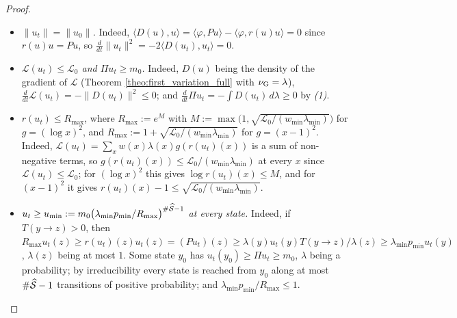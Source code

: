 \begin{proof}
\begin{itemize}
    \item \emph{$\|u_t\|=\|u_0\|$.} Indeed, $\langle D(u),u\rangle=\langle\varphi,Pu\rangle-\langle\varphi,r(u)u\rangle=0$ since $r(u)u=Pu$, so $\frac d{dt}\|u_t\|^2=-2\langle D(u_t),u_t\rangle=0$.
    \item \emph{$\mathcal L(u_t)\leq\mathcal L_0$ and $\Pi u_t\geq m_0$.} Indeed, $D(u)$ being the density of the gradient of $\mathcal L$ (Theorem \ref{theo:first_variation_full} with $\nu_{\mathrm{G}}=\lambda$), $\frac d{dt}\mathcal L(u_t)=-\|D(u_t)\|^2\leq0$; and $\frac d{dt}\Pi u_t=-\int D(u_t)\,d\lambda\geq0$ by \emph{(1)}.
    \item \emph{$r(u_t)\leq R_{\max}$}, where $R_{\max}:=e^{M}$ with $M:=\max\bigl(1,\sqrt{\mathcal L_0/(w_{\min}\lambda_{\min})}\bigr)$ for $g=(\log x)^2$, and $R_{\max}:=1+\sqrt{\mathcal L_0/(w_{\min}\lambda_{\min})}$ for $g=(x-1)^2$. Indeed, $\mathcal L(u_t)=\sum_x w(x)\lambda(x)g(r(u_t)(x))$ is a sum of non-negative terms, so $g(r(u_t)(x))\leq\mathcal L_0/(w_{\min}\lambda_{\min})$ at every $x$ since $\mathcal L(u_t)\leq\mathcal L_0$; for $(\log x)^2$ this gives $\log r(u_t)(x)\leq M$, and for $(x-1)^2$ it gives $r(u_t)(x)-1\leq\sqrt{\mathcal L_0/(w_{\min}\lambda_{\min})}$.
    \item \emph{$u_t\geq u_{\min}:=m_0\bigl(\lambda_{\min}p_{\min}/R_{\max}\bigr)^{\#\widehat{\mathcal S}-1}$ at every state.} Indeed, if $T(y\rightarrow z)>0$, then $R_{\max}u_t(z)\geq r(u_t)(z)u_t(z)=(Pu_t)(z)\geq\lambda(y)u_t(y)T(y\rightarrow z)/\lambda(z)\geq\lambda_{\min}p_{\min}u_t(y)$, $\lambda(z)$ being at most $1$. Some state $y_0$ has $u_t(y_0)\geq\Pi u_t\geq m_0$, $\lambda$ being a probability; by irreducibility every state is reached from $y_0$ along at most $\#\widehat{\mathcal S}-1$ transitions of positive probability; and $\lambda_{\min}p_{\min}/R_{\max}\leq1$.
\end{itemize}

\end{proof}
